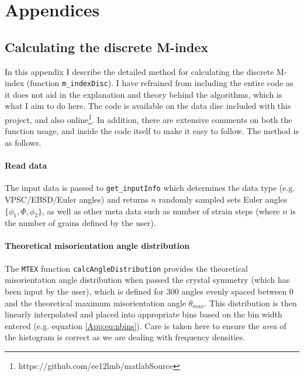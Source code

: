 \documentclass[a4paper,12pt,twoside]{report}
\numberwithin{equation}{chapter}
\begin{document}
\chapter{Appendices}

\section{Calculating the discrete M-index} \label{App:M-index_calc}
In this appendix I describe the detailed method for calculating the discrete M-index (function \texttt{m\_indexDisc}). I have refrained from including the entire code as it does not aid in the explanation and theory behind the algorithms, which is what I aim to do here. The code is available on the data disc included with this project, and also online\footnote{https://github.com/ee12lmb/matlabSource}. In addition, there are extensive comments on both the function usage, and inside the code itself to make it easy to follow. The method is as follows. 

\subsubsection{Read data}
The input data is passed to \texttt{get\_inputInfo} which determines the data type (e.g. VPSC/EBSD/Euler angles) and returns $n$ randomly sampled sets Euler angles $\{\phi_1,\Phi,\phi_2\}$, as well as other meta data such as number of strain steps (where $n$ is the number of grains defined by the user).



\subsubsection{Theoretical misorientation angle distribution}
The \texttt{MTEX} function \texttt{calcAngleDistribution} provides the theoretical misorientation angle distribution when passed the crystal symmetry (which has been input by the user), which is defined for 300 angles evenly spaced between 0 and the theoretical maximum misorientation angle $\theta_{max}$. This distribution is then linearly interpolated and placed into appropriate bins based on the bin width entered (e.g. equation \ref{App:eq:nbins}). Care is taken here to ensure the \emph{area} of the histogram is correct as we are dealing with frequency densities.
\end{document}
